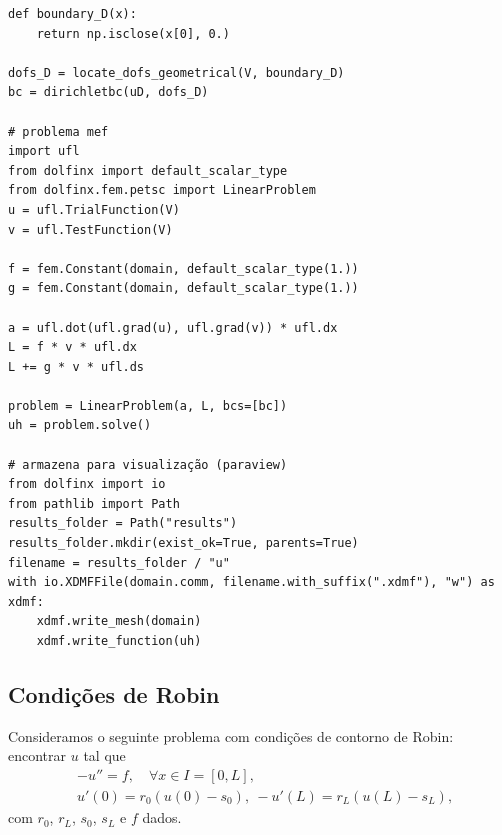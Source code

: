 \begin{ex}
\begin{lstlisting}[caption=ex\_mef1d\_neumann\_nh.py]
def boundary_D(x):
    return np.isclose(x[0], 0.)

dofs_D = locate_dofs_geometrical(V, boundary_D)
bc = dirichletbc(uD, dofs_D)

# problema mef
import ufl
from dolfinx import default_scalar_type
from dolfinx.fem.petsc import LinearProblem
u = ufl.TrialFunction(V)
v = ufl.TestFunction(V)

f = fem.Constant(domain, default_scalar_type(1.))
g = fem.Constant(domain, default_scalar_type(1.))

a = ufl.dot(ufl.grad(u), ufl.grad(v)) * ufl.dx
L = f * v * ufl.dx
L += g * v * ufl.ds

problem = LinearProblem(a, L, bcs=[bc])
uh = problem.solve()

# armazena para visualização (paraview)
from dolfinx import io
from pathlib import Path
results_folder = Path("results")
results_folder.mkdir(exist_ok=True, parents=True)
filename = results_folder / "u"
with io.XDMFFile(domain.comm, filename.with_suffix(".xdmf"), "w") as xdmf:
    xdmf.write_mesh(domain)
    xdmf.write_function(uh)
\end{lstlisting}

\end{ex} 

\subsection{Condições de Robin}
\badgeRevisar

Consideramos o seguinte problema com condições de contorno de Robin{\robin}: encontrar $u$ tal que
\begin{align}
  &-u'' = f,\quad \forall x\in I=[0, L],\label{eq:cc_r_eq}\\
  &u'(0) = r_0(u(0)-s_0),~ -u'(L) = r_L(u(L)-s_L),\label{eq:cc_r_bc}
\end{align}
com $r_0$, $r_L$, $s_0$, $s_L$ e $f$ dados.

